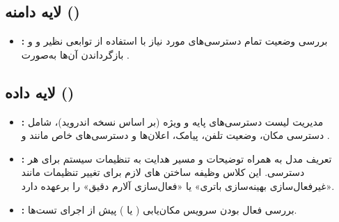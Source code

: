 \subsection{لایه دامنه ()}
\begin{itemize}
    \item \textbf{:}  
    بررسی وضعیت تمام دسترسی‌های مورد نیاز با استفاده از توابعی نظیر  و  و بازگرداندن آن‌ها به‌صورت .
\end{itemize}

\subsection{لایه داده ()}
\begin{itemize}
    \item \textbf{:}  
    مدیریت لیست دسترسی‌های پایه و ویژه (بر اساس نسخه اندروید)، شامل دسترسی مکان، وضعیت تلفن، پیامک، اعلان‌ها و دسترسی‌های خاص مانند  و .
    
    \item \textbf{:}  
    تعریف مدل  به همراه توضیحات و مسیر هدایت به تنظیمات سیستم برای هر دسترسی.  
    این کلاس وظیفه ساختن ‌های لازم برای تغییر تنظیمات مانند «غیرفعال‌سازی بهینه‌سازی باتری» یا «فعال‌سازی آلارم دقیق» را برعهده دارد.

    \item \textbf{:}  
    بررسی فعال بودن سرویس مکان‌یابی ( یا ) پیش از اجرای تست‌ها.
\end{itemize}

